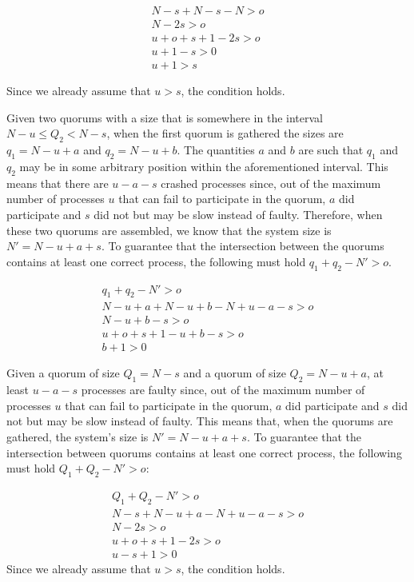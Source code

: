 \indent\indent\indent\indent\indent\indent\parbox{\linewidth-\algorithmicindent*6}{
\begin{align*}
	N-s+N-s-N> o \\
	N-2s > o \\
	u+o+s+1-2s > o \\
	u+1-s>0 \\
	u+1>s 
\end{align*}}
\indent\indent\indent\indent\indent\indent\parbox{\linewidth-\algorithmicindent*6}{
Since we already assume that $u>s$, the condition holds.\par
Given two quorums with a size that is somewhere in the  interval $N-u \leq Q_2 < N-s$, when the first quorum is gathered the sizes are $q_1= N-u+a$ and $q_2=N-u+b$. The quantities $a$ and $b$ are such that $q_1$ and $q_2$ may be in some arbitrary position within the aforementioned interval. This means that there are $u-a-s$ crashed processes since, out of the maximum number of processes $u$ that can fail to participate in the quorum, $a$ did participate and $s$ did not but may be slow instead of faulty. Therefore, when these two quorums are assembled, we know that the system size is $N'=N-u+a+s$. To guarantee that the intersection between the quorums contains at least one correct process, the following must hold $q_1+q_2-N'>o$. }
\indent\indent\indent\indent\indent\indent\parbox{\linewidth-\algorithmicindent*6}{
\begin{align*}
	q_1+q_2-N'>o \\
	N-u+a+N-u+b-N+u-a-s>o \\
	N-u+b-s>o \\
	u+o+s+1-u+b-s>o\\
	b+1>0
\end{align*}}
\indent\indent\indent\indent\indent\indent\parbox{\linewidth-\algorithmicindent*6}{
Given a quorum of size $Q_1=N-s$ and a quorum of size $Q_2=N-u+a$, at least $u-a-s$ processes are faulty since, out of the maximum number of processes $u$ that can fail to participate in the quorum, $a$ did participate and $s$ did not but may be slow instead of faulty. This means that, when the quorums are gathered, the system's size is $N'=N-u+a+s$. To guarantee that the intersection between quorums contains at least one correct process, the following must hold $Q_1+Q_2-N'>o$: }
\indent\indent\indent\indent\indent\indent\parbox{\linewidth-\algorithmicindent*6}{
\begin{align*}
	Q_1+Q_2-N'>o \\
	N-s+N-u+a-N+u-a-s>o\\
	N-2s>o\\
	u+o+s+1-2s>o\\
	u-s+1>0
\end{align*}
Since we already assume that $u>s$, the condition holds.}
